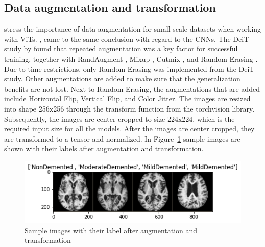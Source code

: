 \documentclass[11pt, a4paper]{article}
\begin{document}
\subsection{Data augmentation and transformation} \label{subs:aug} 
\cite{Touvron2021TrainingAttention} stress the importance of data augmentation for small-scale datasets when working with ViTs. \cite{Ebrahimighahnavieh2020DeepReview}, came to the same conclusion with regard to the CNNs. The DeiT study by \cite{Touvron2021TrainingAttention} found that repeated augmentation \citep{Berman2019MultiGrain:Instances,Hoffer2020AugmentRepetition} was a key factor for successful training, together with RandAugment \citep{Cubuk2020Randaugment:Space}, Mixup \citep{Zhang2018MixUp:Minimization}, Cutmix \citep{Yun2019CutMix:Features}, and Random Erasing \citep{Zhong2020RandomAugmentation}. Due to time restrictions, only Random Erasing was implemented from the DeiT study. Other augmentations are added to make sure that the generalization benefits are not lost. Next to Random Erasing, the augmentations that are added include Horizontal Flip, Vertical Flip, and Color Jitter. The images are resized into shape 256x256 through the transform function from the torchvision library. Subsequently, the images are center cropped to size 224x224, which is the required input size for all the models. After the images are center cropped, they are transformed to a tensor and normalized. In Figure~\ref{fig:sample} sample images are shown with their labels after augmentation and transformation.

\begin{figure}[h]
    \centering
    \includegraphics[width=\textwidth]{Sample images.png}
    \caption{Sample images with their label after augmentation and transformation}
    \label{fig:sample}
\end{figure}
\end{document}
